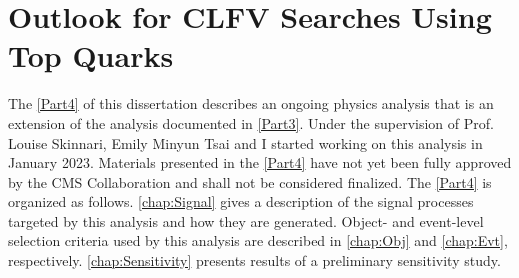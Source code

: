 \part{Outlook for CLFV Searches Using Top Quarks}
\label{Part4}
The \autoref{Part4} of this dissertation describes an ongoing physics analysis that is an extension of the analysis documented in \autoref{Part3}. Under the supervision of Prof. Louise Skinnari, Emily Minyun Tsai and I started working on this analysis in January 2023. Materials presented in the \autoref{Part4} have not yet been fully approved by the \ac{CMS} Collaboration and shall not be considered finalized. The \autoref{Part4} is organized as follows. \autoref{chap:Signal} gives a description of the signal processes targeted by this analysis and how they are generated. Object- and event-level selection criteria used by this analysis are described in \autoref{chap:Obj} and \autoref{chap:Evt}, respectively. \autoref{chap:Sensitivity} presents results of a preliminary sensitivity study.




